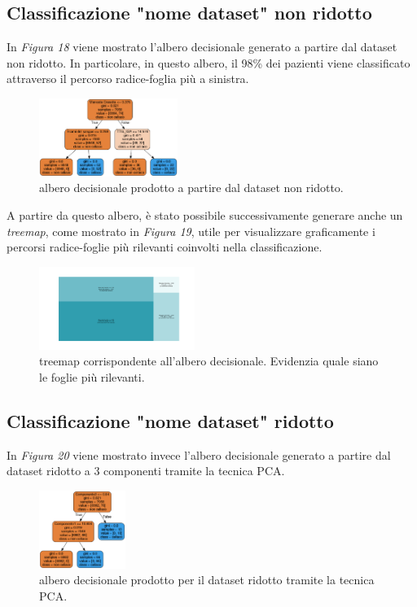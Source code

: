 \documentclass[11pt,a4paper,twocolumn]{article}
\begin{document}
\subsection{Classificazione "nome dataset" non ridotto}
In \emph{Figura 18} viene mostrato l'albero decisionale generato a partire dal dataset non ridotto. In particolare, in questo albero, il 98\% dei pazienti viene classificato attraverso il percorso radice-foglia più a sinistra.

\begin{figure}[H]
	\centering
	\includegraphics[width=0.4\textwidth]{img/decision_tree.png}
	\caption{albero decisionale prodotto a partire dal dataset non ridotto.}
\end{figure}

A partire da questo albero, è stato possibile successivamente generare anche un \emph{treemap}, come mostrato in \emph{Figura 19}, utile per visualizzare graficamente i percorsi radice-foglie più rilevanti coinvolti nella classificazione.
\begin{figure}[H]
	\centering
	\includegraphics[width=0.45\textwidth]{img/treemap.png}
	\caption{treemap corrispondente all'albero decisionale. Evidenzia quale siano le foglie più rilevanti.}
\end{figure}

\subsection{Classificazione "nome dataset" ridotto}
In \emph{Figura 20} viene mostrato invece l'albero decisionale generato a partire dal dataset ridotto a 3 componenti tramite la tecnica PCA.
\begin{figure}[H]
	\centering
	\includegraphics[width=0.25\textwidth]{img/decision_tree_PCA.png}
	\caption{albero decisionale prodotto per il dataset ridotto tramite la tecnica PCA.}
\end{figure}
\end{document}
